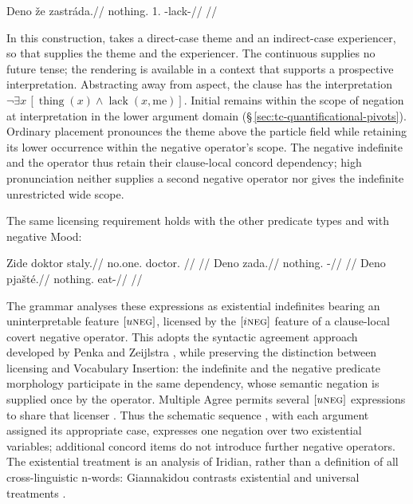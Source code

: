 \pex\label{ex:nm-negative-concord}
\a
\begingl
\gla Deno že zastráda.//
\glb nothing.\Dir{} 1\Sg{}.\Ind{} \Neg{}-lack-\Cont{}//
\glft {}//
\endgl
\a \ljudge{*}
\xe

\noindent In this construction,  takes a direct-case theme and
an indirect-case experiencer, so that  supplies the theme and
 the experiencer. The continuous  supplies no future tense;
the rendering  is available in a context that supports
a prospective interpretation. Abstracting away from aspect, the clause has
the interpretation $\neg\exists x\,[\operatorname{thing}(x)\land
\operatorname{lack}(x,\mathrm{me})]$. Initial  remains within the
scope of negation at interpretation in the lower argument domain
(§\,\ref{sec:tc-quantificational-pivots}).
Ordinary placement pronounces the theme above the particle field while
retaining its lower occurrence within the negative operator's scope. The
negative indefinite and the operator thus retain their clause-local concord
dependency; high pronunciation neither supplies a second negative operator
nor gives the indefinite unrestricted wide scope.

The same licensing requirement holds with the other predicate types and
with negative Mood:

\pex\label{ex:nm-concord-predication}
\a
\begingl
\gla Zide doktor staly.//
\glb no.one.\Dir{} doctor.\Dir{} \NegCop{}//
\glft {} //
\endgl
\a
\begingl
\gla Deno zada.//
\glb nothing.\Dir{} \NegExst{}-\Cont{}//
\glft {} //
\endgl
\a
\begingl
\gla Deno pjašté.//
\glb nothing.\Dir{} eat-\Proh{}//
\glft {} //
\endgl
\xe

The grammar analyses these expressions as existential indefinites bearing
an uninterpretable feature $[u\textsc{neg}]$, licensed by the $[i\textsc{neg}]$ feature of a
clause-local covert negative operator. This adopts the syntactic agreement
approach developed by Penka and Zeijlstra \cite{penka2011,zeijlstra2022}, while preserving the
distinction between licensing and Vocabulary Insertion: the indefinite and
the negative predicate morphology participate in the same dependency, whose
semantic negation is supplied once by the operator. Multiple Agree permits
several $[u\textsc{neg}]$ expressions to share that licenser \cite{penka2012}. Thus the schematic sequence
, with each argument assigned its
appropriate case, expresses one negation over two existential variables;
additional concord items do not introduce further negative operators. The
existential treatment is an analysis of Iridian, rather than a definition of
all cross-linguistic n-words: Giannakidou contrasts
existential and universal treatments \cite{giannakidou2006}.

